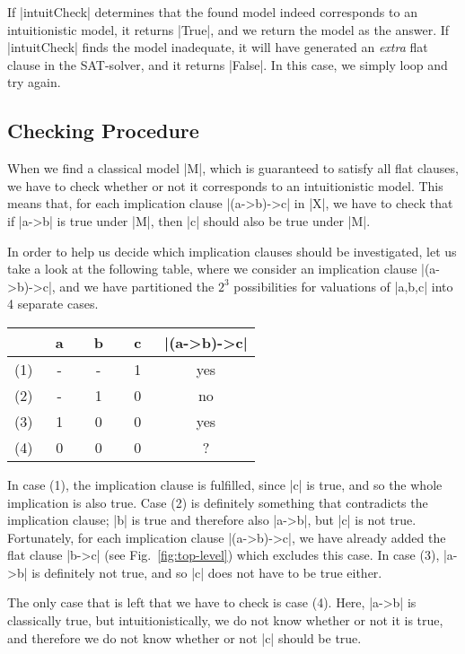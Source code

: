 \documentclass{llncs}
\begin{document}
If |intuitCheck| determines that the found model indeed corresponds to an intuitionistic model, it returns |True|, and we return the model as the answer. If |intuitCheck| finds the model inadequate, it will have generated an {\em extra} flat clause in the SAT-solver, and it returns |False|. In this case, we simply loop and try again.

\subsection{Checking Procedure}

When we find a classical model |M|, which is guaranteed to satisfy all flat clauses, we have to check whether or not it corresponds to an intuitionistic model. This means that, for each implication clause |(a->b)->c| in |X|, we have to check that if |a->b| is true under |M|, then |c| should also be true under |M|.

In order to help us decide which implication clauses should be investigated, let us take a look at the following table, where we consider an implication clause |(a->b)->c|, and we have partitioned the $2^3$ possibilities for valuations of |a,b,c| into 4 separate cases.

\begin{center}
\begin{tabular}{c||ccc||c}
 & a & b & c & |(a->b)->c| \\
\hline
(1) & - & - & $\;$ 1 $\;$ & yes \\
(2) & - & $\;$ 1 $\;$ & 0 & no  \\
(3) & $\;$ 1 $\;$ & 0 & 0 & yes \\
(4) & 0 & 0 & 0 & ?   \\
\end{tabular}
\end{center}

In case (1), the implication clause is fulfilled, since |c| is true, and so the whole implication is also true. Case (2) is definitely something that contradicts the implication clause; |b| is true and therefore also |a->b|, but |c| is not true. Fortunately, for each implication clause |(a->b)->c|, we have already added the flat clause |b->c| (see Fig.\ \ref{fig:top-level}) which excludes this case. In case (3), |a->b| is definitely not true, and so |c| does not have to be true either.

The only case that is left that we have to check is case (4). Here, |a->b| is classically true, but intuitionistically, we do not know whether or not it is true, and therefore we do not know whether or not |c| should be true.
\end{document}
